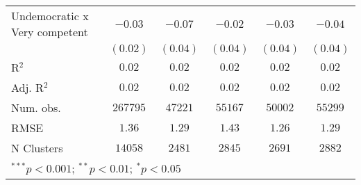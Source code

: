 \begin{table}[!htbp]
\begin{center}
\begin{tabular}{l c c c c c}
Undemocratic x Very competent   & $-0.03$       & $-0.07$       & $-0.02$       & $-0.03$       & $-0.04$       \\
                                & $(0.02)$      & $(0.04)$      & $(0.04)$      & $(0.04)$      & $(0.04)$      \\
\hline
R$^2$                           & $0.02$        & $0.02$        & $0.02$        & $0.02$        & $0.02$        \\
Adj. R$^2$                      & $0.02$        & $0.02$        & $0.02$        & $0.02$        & $0.02$        \\
Num. obs.                       & $267795$      & $47221$       & $55167$       & $50002$       & $55299$       \\
RMSE                            & $1.36$        & $1.29$        & $1.43$        & $1.26$        & $1.29$        \\
N Clusters                      & $14058$       & $2481$        & $2845$        & $2691$        & $2882$        \\
\hline
\multicolumn{6}{l}{\scriptsize{$^{***}p<0.001$; $^{**}p<0.01$; $^{*}p<0.05$}}
\end{tabular}
\label{table_a2}
\end{center}
\end{table}
